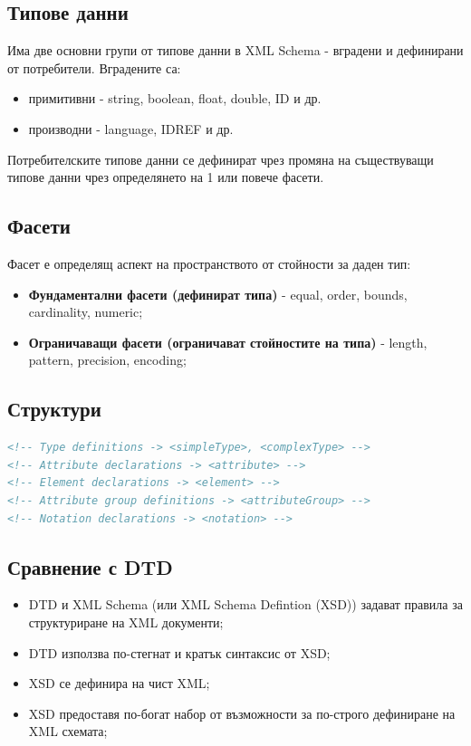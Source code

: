 \documentclass[fleqn,12pt]{article}
\begin{document}
\subsection{Типове данни}

Има две основни групи от типове данни в XML Schema - вградени и дефинирани от потребители.
Вградените са:
\begin{itemize}
    \item примитивни - string, boolean, float, double, ID и др.
    \item производни - language, IDREF и др.
\end{itemize}

Потребителските типове данни се дефинират чрез промяна на съществуващи типове данни чрез определянето на 1 или повече фасети.

\subsection{Фасети}

Фасет е определящ аспект на пространството от стойности за даден тип:
\begin{itemize}
    \item \textbf{Фундаментални фасети (дефинират типа)} - equal, order, bounds, cardinality, numeric;
    \item \textbf{Ограничаващи фасети (ограничават стойностите на типа)} - length, pattern, precision, encoding;
\end{itemize}

\subsection{Структури}


\begin{lstlisting}[language=XML, caption=XSD elements]
<!-- Type definitions -> <simpleType>, <complexType> -->
<!-- Attribute declarations -> <attribute> -->
<!-- Element declarations -> <element> -->
<!-- Attribute group definitions -> <attributeGroup> -->
<!-- Notation declarations -> <notation> -->
\end{lstlisting}

\subsection{Сравнение с DTD}

\begin{itemize}
    \item DTD и XML Schema (или XML Schema Defintion (XSD)) задават правила за структуриране на XML документи;
    \item DTD използва по-стегнат и кратък синтаксис от XSD;
    \item XSD се дефинира на чист XML;
    \item XSD предоставя по-богат набор от възможности за по-строго дефиниране на XML схемата;
\end{itemize}
\end{document}
